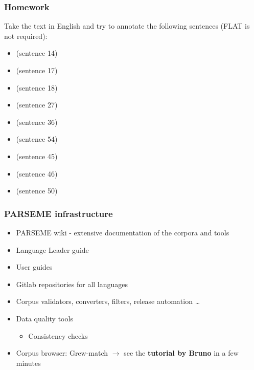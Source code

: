 \documentclass[xcolor=dvipsnames]{beamer}
\begin{document}
\begin{frame} 
\frametitle{Homework}

Take the text in English \href{https://github.com/UniDive/2023-unidive-webinar/blob/main/parseme-tutorial/corpus-en.txt}{} and try to annotate the following sentences (FLAT is not required):

\begin{block}{}
\begin{itemize}
\item {} (sentence 14)
\item {} (sentence 17)
\item {} (sentence 18)
\item {} (sentence 27)
\item {} (sentence 36)
\item {} (sentence 54)
\item {} (sentence 45)
\item {} (sentence 46)
\item {} (sentence 50)
\end{itemize}
\end{block}

\end{frame}

\begin{frame} 
\frametitle{PARSEME infrastructure}

\begin{block}{}
\begin{itemize}
\item PARSEME wiki - extensive documentation of the corpora and tools  \href{https://gitlab.com/parseme/corpora/-/wikis}{\beamergotobutton{[link]}}
\item Language Leader guide
\item User guides
\item Gitlab repositories for all languages %
\item Corpus validators, converters, filters, release automation \ldots
\item Data quality tools
   \begin{itemize}
   \item Consistency checks %
   \end{itemize} 
\item Corpus browser: Grew-match $\longrightarrow$ see the \textbf{tutorial by Bruno} in a few minutes
\end{itemize}
\end{block}

\end{frame}
\end{document}
